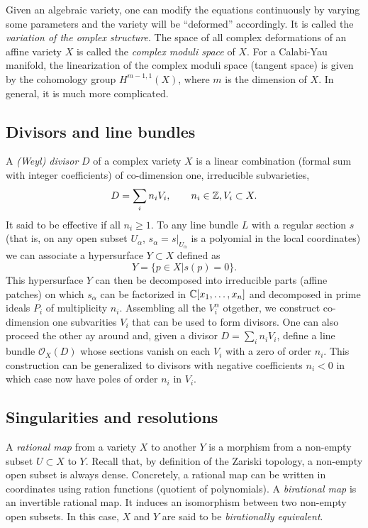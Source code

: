         Given an algebraic variety, one can modify the equations continuously by varying some parameters and the variety will be ``deformed'' accordingly. It is called the \emph{variation of the omplex structure}. The space of all complex deformations of an affine variety $X$ is called the \emph{complex moduli space} of $X$. For a Calabi-Yau manifold, the linearization of the complex moduli space (tangent space) is given by the cohomology group $H^{m-1,1}(X)$, where $m$ is the dimension of $X$. In general, it is much more complicated.

    \subsection{Divisors and line bundles}

        A \emph{(Weyl) divisor} $D$ of a complex variety $X$ is a linear combination (formal sum with integer coefficients) of co-dimension one, irreducible subvarieties,
        \begin{equation}
            D=\sum_i n_iV_i,\qquad n_i\in\mathbb{Z},V_i\subset X.
        \end{equation}
        It said to be effective if all $n_i\geq1$. To any line bundle $L$ with a regular section $s$ (that is, on any open subset $U_\alpha$, $s_\alpha=s|_{U_\alpha}$ is a polyomial in the local coordinates) we can associate a hypersurface $Y\subset X$ defined as
        \begin{equation}
            Y=\{p\in X|s(p)=0\}.
        \end{equation}
        This hypersurface $Y$ can then be decomposed into irreducible parts (affine patches) on which $s_\alpha$ can be factorized in $\mathbb{C}[x_1,\dots,x_n]$ and decomposed in prime ideals $P_i$ of multiplicity $n_i$. Assembling all the $V^\alpha_i$ otgether, we construct co-dimension one subvarities $V_i$ that can be used to form divisors. One can also proceed the other ay around and, given a divisor $D=\sum_i n_iV_i$, define a line bundle $\mathcal{O}_X(D)$ whose sections vanish on each $V_i$ with a zero of order $n_i$. This construction can be generalized to divisors with negative coefficients $n_i<0$ in which case now have poles of order $n_i$ in $V_i$.

    \subsection{Singularities and resolutions}

        A \emph{rational map} from a variety $X$ to another $Y$ is a morphism from a non-empty subset $U\subset X$ to $Y$. Recall that, by definition of the Zariski topology, a non-empty open subset is always dense. Concretely, a rational map can be written in coordinates using ration functions (quotient of polynomials). A \emph{birational map} is an invertible rational map. It induces an isomorphism between two non-empty open subsets. In this case, $X$ and $Y$ are said to be \emph{birationally equivalent}.

